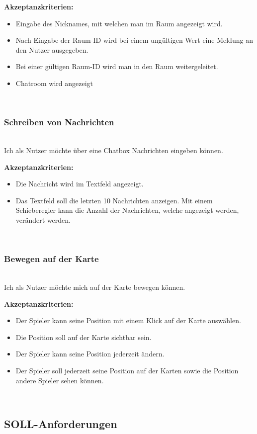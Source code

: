 \documentclass[conference]{IEEEtran}
\begin{document}
	\textbf{Akzeptanzkriterien:}
	\begin{itemize}
		\item Eingabe des Nicknames, mit welchen man im Raum angezeigt wird.
		\item Nach Eingabe der Raum-ID  wird bei einem ungültigen Wert eine Meldung an den Nutzer ausgegeben.
		\item Bei einer gültigen Raum-ID wird man in den Raum weitergeleitet.
		\item Chatroom wird angezeigt
	\end{itemize}
	\ \\
	\subsubsection{Schreiben von Nachrichten}
	\ \\
	Ich als Nutzer möchte über eine Chatbox Nachrichten eingeben können.
	
	\textbf{Akzeptanzkriterien:}
	\begin{itemize}
		\item Die Nachricht wird im Textfeld angezeigt.
		\item Das Textfeld soll die letzten 10 Nachrichten anzeigen. Mit einem Schieberegler kann die Anzahl der Nachrichten, welche angezeigt werden, verändert werden.
	\end{itemize}
	
	\ \\
	\subsubsection{Bewegen auf der Karte}
	\ \\
	Ich als Nutzer möchte mich auf der Karte bewegen können.
	
	\textbf{Akzeptanzkriterien:}
	\begin{itemize}
		\item Der Spieler kann seine Position mit einem Klick auf der Karte auswählen.
		\item Die Position soll auf der Karte sichtbar sein.
		\item Der Spieler kann seine Position jederzeit ändern.
		\item Der Spieler soll jederzeit seine Position auf der Karten sowie die Position andere Spieler sehen können.
	\end{itemize}
	
	\ \\
	\subsection{SOLL-Anforderungen}
\end{document}
